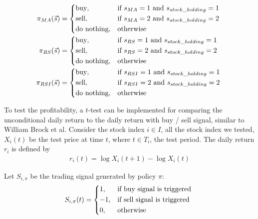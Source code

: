\documentclass[11pt,a4paper]{article}
\numberwithin{equation}{section}
\begin{document}
\begin{align}
  \pi_{MA} (\vec{s})  & = \begin{dcases*}
                            \text{buy},        & if $s_{MA} = 1$ and $s_{stock\_holding} = 1$ \\
                            \text{sell},       & if $s_{MA} = 2$ and $s_{stock\_holding} = 2$ \\
                            \text{do nothing}, & otherwise
                          \end{dcases*} \\
  \pi_{RS} (\vec{s})  & = \begin{dcases*}
                            \text{buy},        & if $s_{RS} = 1$ and $s_{stock\_holding} = 1$ \\
                            \text{sell},       & if $s_{RS} = 2$ and $s_{stock\_holding} = 2$ \\
                            \text{do nothing}, & otherwise
                          \end{dcases*} \\
  \pi_{RSI} (\vec{s}) & = \begin{dcases*}
                            \text{buy},        & if $s_{RSI} = 1$ and $s_{stock\_holding} = 1$ \\
                            \text{sell},       & if $s_{RSI} = 2$ and $s_{stock\_holding} = 2$ \\
                            \text{do nothing}, & otherwise
                          \end{dcases*}
\end{align}

To test the profitability, a $t$-test can be implemented for comparing the unconditional daily return to the daily return with buy / sell signal, similar to William Brock et al. Consider the stock index $i \in I$, all the stock index we tested, $X_i (t)$ be the test price at time $t$, where $t \in T_i$, the test period. The daily return $r_i$ is defined by
\begin{align}
  r_i(t) = \log X_i (t + 1) - \log X_i (t)
\end{align}

Let $S_{i, \pi}$ be the trading signal generated by policy $\pi$:
\begin{align}
  S_{i, \pi} (t) = \begin{dcases*}
                     1,  & if buy signal is triggered  \\
                     -1, & if sell signal is triggered \\
                     0,  & otherwise
                   \end{dcases*}
\end{align}
\end{document}
